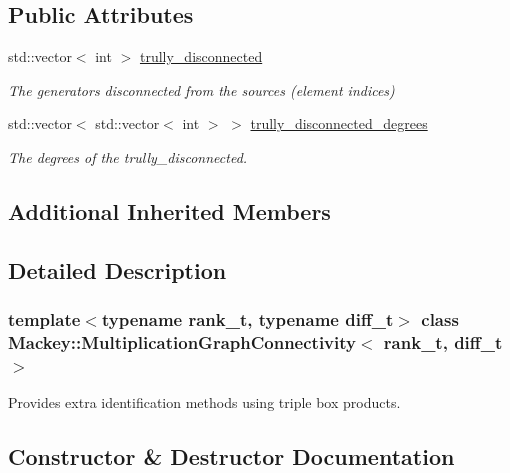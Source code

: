 \subsection*{Public Attributes}
\begin{DoxyCompactItemize}
\item 
std\+::vector$<$ int $>$ \hyperlink{classMackey_1_1MultiplicationGraphConnectivity_a4f13de641c34260697b086a9e0a559e9}{trully\+\_\+disconnected}
\begin{DoxyCompactList}\small\item\em The generators disconnected from the sources (element indices) \end{DoxyCompactList}\item 
std\+::vector$<$ std\+::vector$<$ int $>$ $>$ \hyperlink{classMackey_1_1MultiplicationGraphConnectivity_aeb3b83b6505dcaf1ec2759259ba66e5c}{trully\+\_\+disconnected\+\_\+degrees}
\begin{DoxyCompactList}\small\item\em The degrees of the trully\+\_\+disconnected. \end{DoxyCompactList}\end{DoxyCompactItemize}
\subsection*{Additional Inherited Members}


\subsection{Detailed Description}
\subsubsection*{template$<$typename rank\+\_\+t, typename diff\+\_\+t$>$\newline
class Mackey\+::\+Multiplication\+Graph\+Connectivity$<$ rank\+\_\+t, diff\+\_\+t $>$}

Provides extra identification methods using triple box products. 

\subsection{Constructor \& Destructor Documentation}
\mbox{\label{classMackey_1_1MultiplicationGraphConnectivity_aef4ccbe9bb70020fc9ed264964fbda7d}} 
